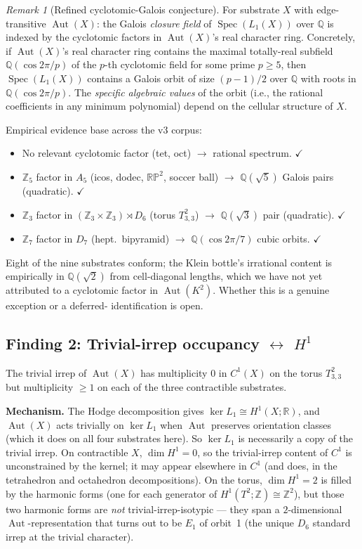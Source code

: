 \documentclass[12pt,a4paper]{article}
\theoremstyle{definition}
\theoremstyle{remark}
\newtheorem{remark}[theorem]{Remark}
\newcommand{\bZ}{\mathbb{Z}}
\newcommand{\bR}{\mathbb{R}}
\newcommand{\bQ}{\mathbb{Q}}                %
\DeclareMathOperator{\Aut}{Aut}
\DeclareMathOperator{\Spec}{Spec}
\begin{document}
\begin{remark}[Refined cyclotomic-Galois conjecture]\label{rem:refined-conjecture}
For substrate $X$ with edge-transitive $\Aut(X)$: the Galois
\emph{closure field} of $\Spec(L_1(X))$ over $\bQ$ is indexed by the
cyclotomic factors in $\Aut(X)$'s real character ring. Concretely,
if $\Aut(X)$'s real character ring contains the maximal totally-real
subfield $\bQ(\cos 2\pi/p)$ of the $p$-th cyclotomic field for some
prime $p \geq 5$, then $\Spec(L_1(X))$ contains a Galois orbit of size
$(p - 1)/2$ over $\bQ$ with roots in $\bQ(\cos 2\pi/p)$. The
\emph{specific algebraic values} of the orbit (i.e., the rational
coefficients in any minimum polynomial) depend on the cellular
structure of $X$.
\end{remark}

Empirical evidence base across the v3 corpus:
\begin{itemize}\setlength{\itemsep}{0pt}
\item No relevant cyclotomic factor (tet, oct) $\to$ rational
  spectrum. $\checkmark$
\item $\bZ_5$ factor in $A_5$ (icos, dodec, $\mathbb{RP}^2$,
  soccer ball) $\to$ $\bQ(\sqrt 5)$ Galois pairs (quadratic). $\checkmark$
\item $\bZ_3$ factor in $(\bZ_3 \times \bZ_3) \rtimes D_6$ (torus
  $T^2_{3,3}$) $\to$ $\bQ(\sqrt 3)$ pair (quadratic). $\checkmark$
\item $\bZ_7$ factor in $D_7$ (hept.\ bipyramid) $\to$ $\bQ(\cos 2\pi/7)$
  cubic orbits. $\checkmark$
\end{itemize}

Eight of the nine substrates conform; the Klein bottle's irrational
content is empirically in $\bQ(\sqrt 2)$ from cell-diagonal lengths,
which we have not yet attributed to a cyclotomic factor in
$\Aut(K^2)$. Whether this is a genuine exception or a deferred-
identification is open.

\subsection{Finding 2: Trivial-irrep occupancy
$\leftrightarrow$ $H^1$}\label{sec:dh-cs-trivial}

The trivial irrep of $\Aut(X)$ has multiplicity $0$ in $C^1(X)$ on the
torus $T^2_{3,3}$ but multiplicity $\ge 1$ on each of the three
contractible substrates.

\textbf{Mechanism.} The Hodge decomposition gives
$\ker L_1 \cong H^1(X; \bR)$, and $\Aut(X)$ acts trivially on
$\ker L_1$ when $\Aut$ preserves orientation classes (which it does on
all four substrates here). So $\ker L_1$ is necessarily a copy of the
trivial irrep. On contractible $X$, $\dim H^1 = 0$, so the trivial-irrep
content of $C^1$ is unconstrained by the kernel; it may appear elsewhere
in $C^1$ (and does, in the tetrahedron and octahedron decompositions). On
the torus, $\dim H^1 = 2$ is filled by the harmonic forms (one for each
generator of $H^1(T^2; \bZ) \cong \bZ^2$), but those two harmonic forms
are \emph{not} trivial-irrep-isotypic --- they span a $2$-dimensional
$\Aut$-representation that turns out to be $E_1$ of orbit~1 (the unique
$D_6$ standard irrep at the trivial character).
\end{document}
